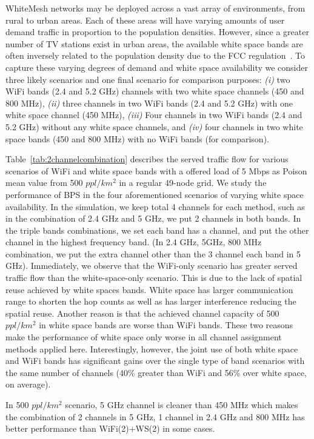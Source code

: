 WhiteMesh networks may be deployed across a vast array of environments, from
rural to urban areas. Each of these areas will have varying amounts of user
demand traffic in proportion to the population densities. 
However, since a greater number of TV stations exist in urban areas, the available 
white space bands are often inversely related to the population density due to 
the FCC regulation~\cite{fccwhitespace}. To capture these varying degrees of demand 
and white space availability we consider three likely scenarios and one final 
scenario for comparison purposes: {\it (i)} two WiFi bands (2.4 and
5.2 GHz) channels with two white space channels (450 and 800 MHz), {\it (ii)} 
three channels in two WiFi bands (2.4 and 5.2 GHz) with one white space channel 
(450 MHz), {\it (iii)} Four channels in two WiFi bands (2.4 and 5.2 GHz) without 
any white space channels, and {\it (iv)} four channels in two white space bands 
(450 and 800 MHz) with no WiFi bands (for comparison).

Table~\ref{tab:2channelcombination} describes the served traffic flow 
for various scenarios of WiFi and white space bands with a offered load 
of 5 Mbps as Poison mean value from 500 $ppl/km^2$ in a regular 49-node grid. 
We study the performance of BPS in the four aforementioned scenarios of varying 
white space availability. In the simulation, we keep total 4 channels for each
method, such as in the combination of 2.4 GHz and 5 GHz, we put 2 channels in both 
bands. In the triple bands combinations, we set each band has a channel, and put the 
other channel in the highest frequency band. (In 2.4 GHz, 5GHz, 800 MHz combination, 
we put the extra channel other than the 3 channel each band in 5 GHz). 
Immediately, we observe that the WiFi-only scenario has greater served traffic flow 
than the white-space-only scenario. This is due to the lack of spatial reuse achieved 
by white spaces bands. White space has larger communication range to shorten 
the hop counts as well as has larger interference reducing the spatial reuse. 
Another reason is that the achieved channel capacity of 500 $ppl/km^2$ in white 
space bands are worse than WiFi bands. These two reasons make the performance of 
white space only worse in all channel assignment methods applied here.
Interestingly, however, the joint use of both white space and WiFi bands has 
significant gains over the single type of band scenarios with the same number of 
channels (40\% greater than WiFi and 56\% over white space, on average). 

In 500 $ppl/km^2$ scenario, 5 GHz channel is cleaner than 450 MHz which makes 
the combination of 2 channels in 5 GHz, 1 channel in 2.4 GHz and 800 MHz has 
better performance than WiFi(2)+WS(2) in some cases. 


